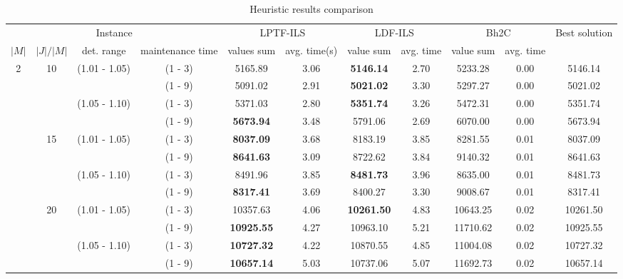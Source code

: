 \documentclass[a4paper,11pt]{article}
\begin{document}
\begin{table}[!ht]
\caption{Heuristic results comparison}
\tiny
\centering
\begin{tabular}{|c|c|c|c|c|c|c|c|c|c|c|}
\hline

\multicolumn{4}{|c|}{Instance} & \multicolumn{2}{|c|}{LPTF-ILS}  & \multicolumn{2}{|c|}{LDF-ILS} &\multicolumn{2}{|c|}{Bh2C} & Best solution  \\

$|M|$ & $|J|/|M|$ & det. range & maintenance time & values sum & avg. time(s) & value sum & avg. time & value sum & avg. time & \\
\hline

2& 10 & (1.01 - 1.05) & (1 - 3)   &  5165.89  &  3.06      & \textbf{5146.14}  &  2.70      &  5233.28  &  0.00      &  5146.14 \\
 &  &  & (1 - 9)  &  5091.02  &  2.91      &  \textbf{5021.02}  &  3.30      &  5297.27  &  0.00      &  5021.02  \\
 &  & (1.05 - 1.10) & (1 - 3)  &  5371.03  &  2.80      &  \textbf{5351.74}  &  3.26      &  5472.31  &  0.00      &  5351.74  \\
 &  &  & (1 - 9)  &  \textbf{5673.94}  &  3.48      &  5791.06  &  2.69      &  6070.00  &  0.00      &  5673.94  \\
 & 15 & (1.01 - 1.05) & (1 - 3)  &  \textbf{8037.09}  &  3.68      &  8183.19  &  3.85      &  8281.55  &  0.01      &  8037.09  \\
 &  &  & (1 - 9)  &  \textbf{8641.63}  &  3.09      &  8722.62  &  3.84      &  9140.32  &  0.01      &  8641.63  \\
 &  & (1.05 - 1.10) & (1 - 3)  &  8491.96  &  3.85      &  \textbf{8481.73}  &  3.96      &  8635.00  &  0.01      &  8481.73  \\
 &  &  & (1 - 9)  &  \textbf{8317.41}  &  3.69      &  8400.27  &  3.30      &  9008.67  &  0.01      &  8317.41  \\
 & 20 & (1.01 - 1.05) & (1 - 3)  &  10357.63  &  4.06      &  \textbf{10261.50}  &  4.83      &  10643.25  &  0.02      &  10261.50 \\
 &  &  & (1 - 9)  &  \textbf{10925.55}  &  4.27      &  10963.10  &  5.21      &  11710.62  &  0.02      &  10925.55 \\
 &  & (1.05 - 1.10) & (1 - 3)  &  \textbf{10727.32}  &  4.22      &  10870.55  &  4.85      &  11004.08  &  0.02      &  10727.32 \\
 &  &  & (1 - 9)  &  \textbf{10657.14}  &  5.03      &  10737.06  &  5.07      &  11692.73  &  0.02      &  10657.14 \\

\end{tabular}
\end{table}
\end{document}

